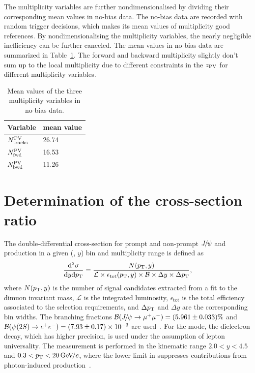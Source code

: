 \documentclass[12pt,a4paper]{article}
\begin{document}
The multiplicity variables are further nondimensionalised by dividing their corresponding mean values in no-bias data. The no-bias data are recorded with random trigger decisions, which makes its mean values of multiplicity good references. By nondimensionalising the multiplicity variables, the nearly negligible inefficiency can be further canceled. The mean values in no-bias data are summarized in Table~\ref{NoBiasMult}. The forward and backward multiplicity slightly don't sum up to the local multiplicity due to different constraints in the $z_{\rm PV}$ for different multiplicity variables. 
\begin{table}[H]
\caption{Mean values of the three multiplicity variables in no-bias data.}
\begin{center}
\begin{tabular}{ll}
\hline
Variable & mean value\\
\hline
	 $N_{\rm tracks}^{\rm PV}$ & 26.74 \\
	 $N_{\rm fwd}^{\rm PV}$  & 16.53 \\
	 $N_{\rm bwd}^{\rm PV}$  & 11.26 \\
\hline
\end{tabular}
\end{center}
\label{NoBiasMult}
\end{table}


\section{Determination of the cross-section ratio}
\label{Ratio of Cross-Section Determination}
\def\effTot{\ensuremath{\epsilon_{\mathrm{tot}}}\xspace}
\def\effTotJ{\ensuremath{\epsilon_{\mathrm{tot,\jpsi}}}\xspace}
\def\effTotP{\ensuremath{\epsilon_{\mathrm{tot,\psitwos}}}\xspace}
\def\effiTotJ{\ensuremath{\epsilon_{\mathrm{\jpsi},i}}\xspace}
\def\effiTotP{\ensuremath{\epsilon_{\mathrm{\psitwos},i}}\xspace}
The double-differential cross-section for prompt and non-prompt ${{J\mskip -3mu/\mskip -2mu\psi}}$ and \psitwos production in a given (\pt, $y$) bin and multiplicity range is defined as
\begin{equation}
    \frac{\deriv^2\sigma}{\deriv y\deriv \pt} 
	= \frac{N(\pt,y)}
           {\mathcal{L}\times\effTot(\pt,y)\times \BR \times\Delta y \times \Delta \pt}, 
  \label{CrossSecJ}
\end{equation} 
where $N(p_{\mathrm{T}},y)$ is the number of signal candidates extracted from a fit to the dimuon invariant mass, $\mathcal{L}$ is the integrated luminosity, \effTot is the total efficiency associated to the selection requirements, and $\Delta p_{\mathrm{T}}$ and $\Delta y$ are the corresponding bin widths. The branching fractions ${\mathcal{B}}({{J\mskip -3mu/\mskip -2mu\psi}}\rightarrow\mu^+\mu^-)=(5.961\pm0.033)\%$ and ${\mathcal{B}}({\psi{(2S)}}\rightarrow e^+e^-)=(7.93\pm0.17)\times10^{-3}$ are used~\cite{Workman:2022ynf}. For the \psitwos mode, the dielectron decay, which has higher precision, is used under the assumption of lepton universality. The measurement is performed in the kinematic range $2.0<y<4.5$ and $0.3<p_{\mathrm{T}}<20\text{\,Ge\kern -0.1em V\!/}c$, where the lower limit in \pt suppresses contributions from photon-induced production~\cite{Ma:2022rfl}.
\end{document}
